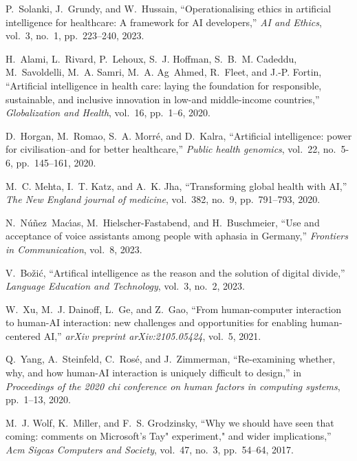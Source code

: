 \documentclass{article}
\begin{document}
\begin{thebibliography}{100}
	P.~Solanki, J.~Grundy, and W.~Hussain, ``Operationalising ethics in artificial
	intelligence for healthcare: A framework for {AI} developers,'' {\em {AI} and
		Ethics}, vol.~3, no.~1, pp.~223--240, 2023.
	
	H.~Alami, L.~Rivard, P.~Lehoux, S.~J. Hoffman, S.~B.~M. Cadeddu, M.~Savoldelli,
	M.~A. Samri, M.~A. Ag~Ahmed, R.~Fleet, and J.-P. Fortin, ``Artificial
	intelligence in health care: laying the foundation for responsible,
	sustainable, and inclusive innovation in low-and middle-income countries,''
	{\em Globalization and Health}, vol.~16, pp.~1--6, 2020.
	
	D.~Horgan, M.~Romao, S.~A. Morr{\'e}, and D.~Kalra, ``Artificial intelligence:
	power for civilisation--and for better healthcare,'' {\em Public health
		genomics}, vol.~22, no.~5-6, pp.~145--161, 2020.
	
	M.~C. Mehta, I.~T. Katz, and A.~K. Jha, ``Transforming global health with
	{AI},'' {\em The New England journal of medicine}, vol.~382, no.~9,
	pp.~791--793, 2020.
	
	N.~N{\'u}{\~n}ez~Mac{\'\i}as, M.~Hielscher-Fastabend, and H.~Buschmeier, ``Use
	and acceptance of voice assistants among people with aphasia in {G}ermany,''
	{\em Frontiers in Communication}, vol.~8, 2023.
	
	V.~Bo{\v{z}}i{\'c}, ``Artifical intelligence as the reason and the solution of
	digital divide,'' {\em Language Education and Technology}, vol.~3, no.~2,
	2023.
	
	W.~Xu, M.~J. Dainoff, L.~Ge, and Z.~Gao, ``From human-computer interaction to
	human-{AI} interaction: new challenges and opportunities for enabling
	human-centered {AI},'' {\em arXiv preprint arXiv:2105.05424}, vol.~5, 2021.
	
	Q.~Yang, A.~Steinfeld, C.~Ros{\'e}, and J.~Zimmerman, ``Re-examining whether,
	why, and how human-{AI} interaction is uniquely difficult to design,'' in
	{\em Proceedings of the 2020 chi conference on human factors in computing
		systems}, pp.~1--13, 2020.
	
	M.~J. Wolf, K.~Miller, and F.~S. Grodzinsky, ``Why we should have seen that
	coming: comments on {M}icrosoft's {T}ay" experiment," and wider
	implications,'' {\em Acm Sigcas Computers and Society}, vol.~47, no.~3,
	pp.~54--64, 2017.
	

\end{thebibliography}
\end{document}
